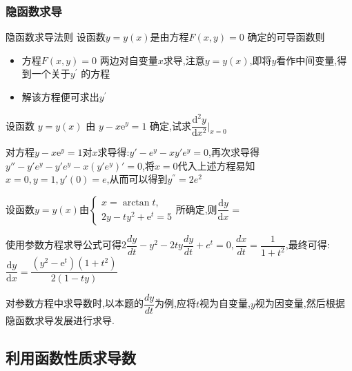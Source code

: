 \documentclass[8pt a4paper, oneside, UTF8]{ctexbook}  %
\begin{document}
\begin{sloppypar}
    \subsubsection{隐函数求导}
    \begin{defn}{隐函数求导法则}{}
        设函数$y=y(x)$是由方程$F(x,y)=0$ 确定的可导函数则
        \begin{itemize}
            \item 方程$F(x,y)=0$ 两边对自变量$x$求导,注意$y=y(x)$,即将$y$看作中间变量,得到一个关于$y^{\prime}$ 的方程
            \item 解该方程便可求出$y^{\prime}$
        \end{itemize}
    \end{defn}
    \begin{problem}
    设函数 $y=y(x)$ 由 $y-x\mathrm{e}^y=1$ 确定,试求$\dfrac{\mathrm{d}^2y}{\mathrm{d}x^2}\Bigg|_{x=0}$
    \end{problem}
    \begin{solution}
        对方程$y-x\mathrm{e}^y=1$对$x$求导得:$y' - e^y-xy'e^y=0$,再次求导得$y'' -y'e^y-y'e^{y}-x\left(y'e^{y}\right)'=0$,将$x=0$代入上述方程易知$x=0,y=1,y'(0)=e$,从而可以得到$y^{''}=2e^2$
    \end{solution}
    \begin{problem}
    设函数$y=y(x)$由$\begin{cases}x=\arctan t,\\2y-ty^2+\mathrm{e}^t=5\end{cases}$所确定,则$\dfrac{\mathrm{d}y}{\mathrm{d}x}=$
    \end{problem}
    \begin{solution}
        使用参数方程求导公式可得$2\dfrac{dy}{dt}-y^2-2ty\dfrac{dy}{dt}+e^t=0,\dfrac{dx}{dt}=\dfrac{1}{1+t^2}$,最终可得:$\dfrac{\mathrm{d}y}{\mathrm{d}x}=\dfrac{(y^{2}-\mathrm{e}^{t})(1+t^{2})}{2(1-ty)}$
    \end{solution}
    \begin{note}
        对参数方程中求导数时,以本题的$\dfrac{dy}{dt}$为例,应将$t$视为自变量,$y$视为因变量,然后根据隐函数求导发展进行求导.
    \end{note}
    \subsection{利用函数性质求导数}

\end{sloppypar}
\end{document}
